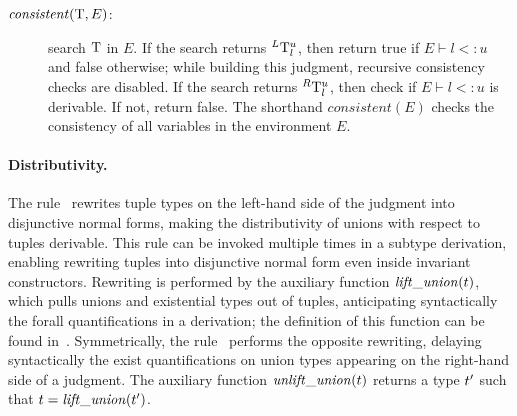 \begin{description}
\item[\normalfont\(\mathit{consistent}(\mathrm{T},E)\):] search \(\mathrm{T}\) in
  \(E\).  If the search returns \(^L \mathrm{T}_l^u\), then return
  true if \(E \vdash l <: u\) and false otherwise; while building this judgment,
  recursive consistency checks are disabled.
  If the search returns \(^R \mathrm{T}_l^u\),
  then check if \(E \vdash l <: u\) is derivable.  If not, return
  false. %
  The shorthand \(\mathit{consistent}(E)\) checks the consistency of all
  variables in the environment \(E\).
\end{description}

\paragraph{Distributivity.}
The rule~
rewrites tuple types on the left-hand side of the judgment into
disjunctive normal forms, making the distributivity of unions
with respect to tuples derivable.  This rule can be invoked multiple
times in a subtype derivation, enabling rewriting tuples
into disjunctive normal form even inside invariant
constructors.
Rewriting is performed by the auxiliary function
\(\mathit{lift\_union}(t)\), which pulls unions and existential types out of
tuples, anticipating
syntactically the forall quantifications in a derivation;
the definition of this function can be found
in~\cite{bib:zappa-nardelli:julia-sub:oopsla:2018}.
Symmetrically, the rule~ performs
the opposite rewriting, delaying syntactically the exist
quantifications on union types appearing on the right-hand side of
a judgment.  The auxiliary function \(\mathit{unlift\_union}(t)\) returns
a type \(t'\) such that \(t = \mathit{lift\_union}(t')\). 

